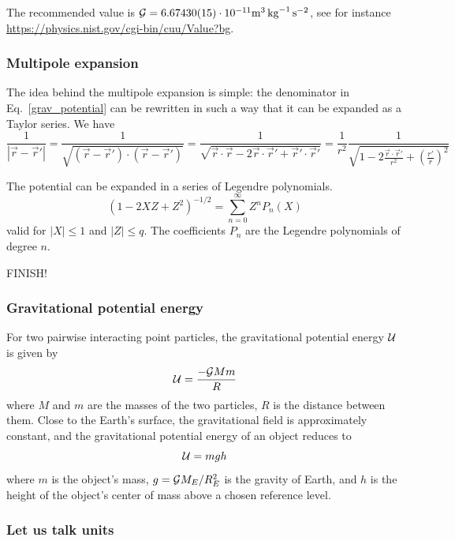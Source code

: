 The recommended value is ${\cal G}=6.67430(15)\cdot 10^{-11} \si{\cubic\meter\per\kg\per\square\second}$, 
see for instance \url{https://physics.nist.gov/cgi-bin/cuu/Value?bg}.

\subsubsection{Multipole expansion}

The idea behind the multipole expansion is simple: the denominator in Eq.~\eqref{grav_potential}
can be rewritten in such a way that it can be expanded as a Taylor series. 
We have 
\[
\frac{1}{|\vec{r}-\vec{r}'|} 
= \frac{1}{\sqrt{ (\vec{r}-\vec{r}') \cdot (\vec{r}-\vec{r}')   }}
= \frac{1}{\sqrt{ \vec{r}\cdot\vec{r} - 2 \vec{r}\cdot \vec{r}' + \vec{r}'\cdot \vec{r}'   }}
= \frac{1}{r^2} \frac{1}{\sqrt{ 1 - 2 \frac{\vec{r}\cdot \vec{r}'}{r^2} + \left(\frac{r'}{r} \right)^2   }}
\]

The potential can be expanded in a series of Legendre polynomials. 
\[
(1-2XZ+Z^2)^{-1/2} = \sum_{n=0}^\infty Z^n P_n(X)
\]
valid for $|X|\le 1$ and $|Z|\le q$. The coefficients $P_n$ are the Legendre polynomials of degree $n$.


FINISH!

\subsubsection{Gravitational potential energy}


For two pairwise interacting point particles, the gravitational potential energy ${\cal U}$
is given by 
\[
{\cal U} = \frac{-{\cal G} Mm}{R}
\]
where $M$ and $m$ are the masses of the two particles, $R$ is the distance between them.
Close to the Earth's surface, the gravitational field is approximately constant, and the gravitational potential energy of an object reduces to
\[
{\cal U} = m g h 
\]
where $m$ is the object's mass, $g = {\cal G} M_E/ R_E^2$ 
is the gravity of Earth, and $h$ is the height of the object's center of mass above a chosen reference level.







\subsubsection{Let us talk units}
 

